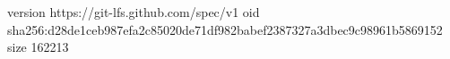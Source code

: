 version https://git-lfs.github.com/spec/v1
oid sha256:d28de1ceb987efa2c85020de71df982babef2387327a3dbec9c98961b5869152
size 162213

